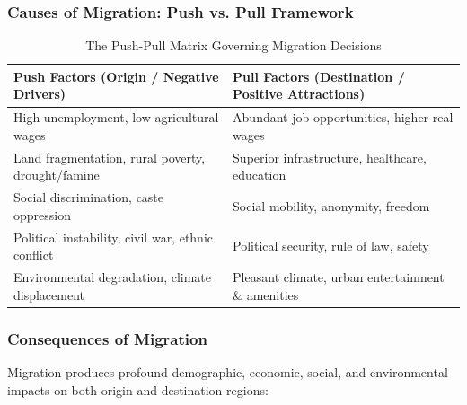 \documentclass[11pt,a4paper]{article}
\begin{document}
\subsubsection{Causes of Migration: Push vs. Pull Framework}
\begin{table}[h!]
\centering
\small
\begin{tabularx}{\textwidth}{X X}
\toprule
\textbf{Push Factors (Origin / Negative Drivers)} & \textbf{Pull Factors (Destination / Positive Attractions)} \\
\midrule
High unemployment, low agricultural wages & Abundant job opportunities, higher real wages \\
Land fragmentation, rural poverty, drought/famine & Superior infrastructure, healthcare, education \\
Social discrimination, caste oppression & Social mobility, anonymity, freedom \\
Political instability, civil war, ethnic conflict & Political security, rule of law, safety \\
Environmental degradation, climate displacement & Pleasant climate, urban entertainment \& amenities \\
\bottomrule
\end{tabularx}
\caption{The Push-Pull Matrix Governing Migration Decisions}
\end{table}

\subsubsection{Consequences of Migration}
Migration produces profound demographic, economic, social, and environmental impacts on both origin and destination regions:
\end{document}
